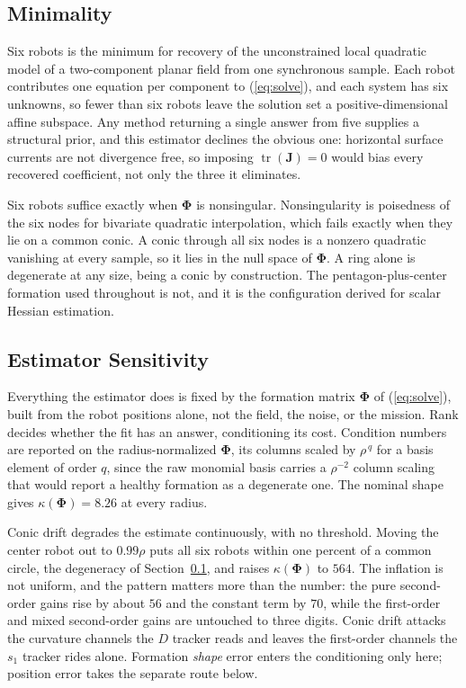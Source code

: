 \documentclass[lettersize,journal]{IEEEtran}
\begin{document}
\subsection{Minimality}
\label{sec:minimality}

Six robots is the minimum for recovery of the unconstrained local
quadratic model of a two-component planar field from one synchronous
sample. Each robot contributes one equation per component to
(\ref{eq:solve}), and each system has six unknowns, so fewer than six
robots leave the solution set a positive-dimensional affine subspace.
Any method returning a single answer from five supplies a structural
prior, and this estimator declines the obvious one: horizontal surface
currents are not divergence free, so imposing
$\operatorname{tr}(\mathbf{J}) = 0$ would bias every recovered
coefficient, not only the three it eliminates.

Six robots suffice exactly when $\boldsymbol{\Phi}$ is nonsingular.
Nonsingularity is poisedness of the six nodes for bivariate quadratic interpolation, which fails exactly when they lie on a common conic. A conic through all six nodes is a nonzero quadratic vanishing at every sample, so it lies in the null space of $\boldsymbol{\Phi}$. A ring
alone is degenerate at any size, being a conic by construction. The
pentagon-plus-center formation used throughout is not, and it is the
configuration \cite{4} derived for scalar Hessian estimation.

\subsection{Estimator Sensitivity}
\label{sec:sensitivity}

Everything the estimator does is fixed by the formation matrix
$\boldsymbol{\Phi}$ of (\ref{eq:solve}), built from the robot positions
alone, not the field, the noise, or the mission. Rank decides whether the fit has an answer, conditioning its cost. Condition numbers are
reported on
the radius-normalized $\boldsymbol{\Phi}$, its columns scaled by
$\rho^{\,q}$ for a basis element of order $q$, since the raw monomial
basis carries a $\rho^{-2}$ column scaling that would report a healthy
formation as a degenerate one. The nominal shape gives
$\kappa(\boldsymbol{\Phi}) = 8.26$ at every radius.

Conic drift degrades the estimate continuously, with no threshold.
Moving the center robot out to $0.99\rho$ puts all
six robots within one percent of a common circle, the degeneracy of
Section~\ref{sec:minimality}, and raises $\kappa(\boldsymbol{\Phi})$ to
$564$. The inflation is not uniform, and the pattern matters more than the number: the pure second-order gains rise by about $56$ and the
constant term by $70$, while the first-order and mixed second-order
gains are untouched to three digits. Conic drift attacks the curvature
channels the $D$ tracker reads and leaves the first-order channels the
$s_1$ tracker rides alone. Formation \emph{shape} error enters the
conditioning only here; position error takes the separate route below.
\end{document}
